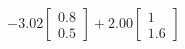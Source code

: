 \documentclass[preview]{standalone}
\begin{document}
\begin{align*}
-3.02 \begin{bmatrix} 0.8 \\ 0.5 \end{bmatrix} + 2.00 \begin{bmatrix} 1 \\ 1.6 \end{bmatrix}
\end{align*}
\end{document}
